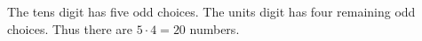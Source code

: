 The tens digit has five odd choices. The units digit has four remaining odd choices. Thus there are $5\cdot4=\boxed{20}$ numbers.
